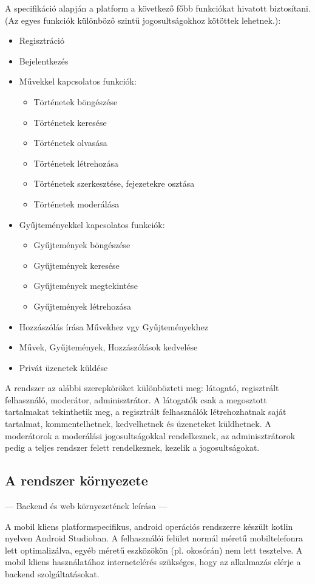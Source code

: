 A specifikáció alapján a platform a következő főbb funkciókat hivatott biztosítani. 
(Az egyes funkciók különböző szintű jogosultságokhoz kötöttek lehetnek.):
\begin{itemize}
    \item  Regisztráció
    \item  Bejelentkezés
    \item  Művekkel kapcsolatos funkciók:
    \begin{itemize}
        \item Történetek böngészése
        \item Történetek keresése
        \item Történetek olvasása
        \item Történetek létrehozása
        \item Történetek szerkesztése, fejezetekre osztása
        \item Történetek moderálása

    \end{itemize}
    \item  Gyűjteményekkel kapcsolatos funkciók:
    \begin{itemize}
        \item Gyűjtemények böngészése
        \item Gyűjtemények keresése
        \item Gyűjtemények megtekintése
        \item Gyűjtemények létrehozása 
    \end{itemize}
    \item  Hozzászólás írása Művekhez vgy Gyűjteményekhez
    \item  Művek, Gyűjtemények, Hozzászólások kedvelése
    \item  Privát üzenetek küldése
\end{itemize}

A rendszer az alábbi szerepköröket különbözteti meg: látogató, regisztrált felhasználó, moderátor, adminisztrátor. 
A látogatók csak a megosztott tartalmakat tekinthetik meg, a regisztrált felhasználók létrehozhatnak saját tartalmat, kommentelhetnek, kedvelhetnek és üzeneteket küldhetnek.
A moderátorok a moderálási jogosultságokkal rendelkeznek, az adminisztrátorok pedig a teljes rendszer felett rendelkeznek, kezelik a jogosultságokat.

\subsection{A rendszer környezete}

--- Backend és web környezetének leírása ---

A mobil kliens platformspecifikus, android operációs rendszerre készült kotlin nyelven Android Studioban.
A felhasználói felület normál méretű mobiltelefonra lett optimalizálva, egyéb méretű eszközökön (pl. okosórán) nem lett tesztelve.
A mobil kliens használatához internetelérés szükséges, hogy az alkalmazás elérje a backend szolgáltatásokat. 